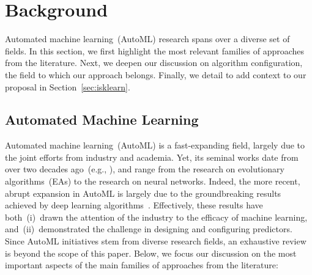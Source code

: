 \section{Background}
\label{sec:background}

Automated machine learning~(AutoML) research spans over a diverse set of fields. In this section, we first highlight the most relevant families of approaches from the literature. Next, we deepen our discussion on algorithm configuration, the field to which our approach belongs. Finally, we detail \irace to add context to our proposal in Section~\ref{sec:isklearn}.

%
%
\subsection{Automated Machine Learning}

Automated machine learning~(AutoML) is a fast-expanding field, largely due to the joint efforts from industry and academia. Yet, its seminal works date from over two decades ago~(e.g., \cite{RonSch1994}), and range from the research on evolutionary algorithms~(EAs) to the research on neural networks. Indeed, the more recent, abrupt expansion in AutoML is largely due to the groundbreaking results achieved by deep learning algorithms~\cite{LeCBenGeo2015dl}. Effectively, these results have both~(i)~drawn the attention of the industry to the efficacy of machine learning, and~(ii)~demonstrated the challenge in designing and configuring predictors.
Since AutoML initiatives stem from diverse research fields, an exhaustive review is beyond the scope of this paper. Below, we focus our discussion on the most important aspects of the main families of approaches from the literature:

